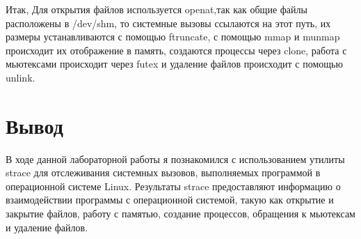 \documentclass[a4paper, 14pt]{article}
\begin{document}
Итак, Для открытия файлов используется openat,так как общие файлы расположены в /dev/shm, то системные вызовы ссылаются на этот путь, их размеры устанавливаются  с помощью ftruncate, с помощью mmap и munmap происходит их отображение в память, создаются процессы через clone, работа с мьютексами происходит через futex и удаление файлов происходит с помощью unlink.

\section*{Вывод}

В ходе данной лабораторной работы я познакомился с использованием утилиты strace для отслеживания системных вызовов, выполняемых программой в операционной системе Linux. Результаты strace предоставляют информацию о взаимодействии программы с операционной системой, такую как открытие и закрытие файлов, работу с памятью, создание процессов, обращения к мьютексам и удаление файлов. 
\end{document}
